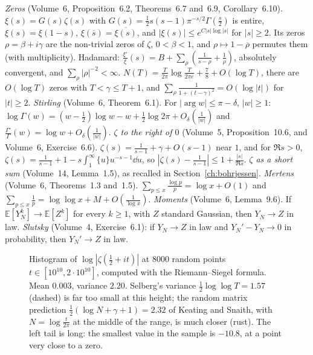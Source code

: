 \begin{reminder}
\emph{Zeros} (Volume~6, Proposition~6.2, Theorems~6.7 and~6.9, Corollary~6.10). $\xi(s)=G(s)\zeta(s)$ with $G(s)=\frac12s(s-1)\pi^{-s/2}\Gamma(\frac s2)$ is entire, $\xi(s)=\xi(1-s)$, $\xi(\overline s)=\overline{\xi(s)}$, and $|\xi(s)|\le e^{C|s|\log|s|}$ for $|s|\ge2$. Its zeros $\rho=\beta+i\gamma$ are the non-trivial zeros of $\zeta$, $0<\beta<1$, and $\rho\mapsto1-\overline\rho$ permutes them (with multiplicity). Hadamard: $\frac{\xi'}\xi(s)=B+\sum_\rho(\frac1{s-\rho}+\frac1\rho)$, absolutely convergent, and $\sum_\rho|\rho|^{-2}<\infty$. $N(T)=\frac T{2\pi}\log\frac T{2\pi e}+\frac78+O(\log T)$, there are $O(\log T)$ zeros with $T<\gamma\le T+1$, and $\sum_\rho\frac1{1+(t-\gamma)^2}=O(\log|t|)$ for $|t|\ge2$.
\emph{Stirling} (Volume~6, Theorem~6.1). For $|\arg w|\le\pi-\delta$, $|w|\ge1$: $\log\Gamma(w)=(w-\frac12)\log w-w+\frac12\log2\pi+O_\delta(\frac1{|w|})$ and $\frac{\Gamma'}\Gamma(w)=\log w+O_\delta(\frac1{|w|})$.
\emph{$\zeta$ to the right of $0$} (Volume~5, Proposition~10.6, and Volume~6, Exercise~6.6). $\zeta(s)=\frac1{s-1}+\gamma+O(s-1)$ near $1$, and for $\Re s>0$, $\zeta(s)=\frac1{s-1}+1-s\int_1^\infty\{u\}u^{-s-1}\dd u$, so $|\zeta(s)-\frac1{s-1}|\le1+\frac{|s|}{\Re s}$.
\emph{$\zeta$ as a short sum} (Volume~14, Lemma~1.5), as recalled in Section~\ref{ch:bohrjessen}.
\emph{Mertens} (Volume~6, Theorems~1.3 and~1.5). $\sum_{p\le x}\frac{\log p}p=\log x+O(1)$ and $\sum_{p\le x}\frac1p=\log\log x+M+O(\frac1{\log x})$.
\emph{Moments} (Volume~6, Lemma~9.6). If $\mathbb E[Y_N^k]\to\mathbb E[Z^k]$ for every $k\ge1$, with $Z$ standard Gaussian, then $Y_N\to Z$ in law. \emph{Slutsky} (Volume~4, Exercise~6.1): if $Y_N\to Z$ in law and $Y_N'-Y_N\to0$ in probability, then $Y_N'\to Z$ in law.
\end{reminder}

\begin{figure}[ht]
\centering{}
\caption{Histogram of $\log|\zeta(\frac12+it)|$ at $8000$ random points $t\in[10^{10},2\cdot10^{10}]$, computed with the Riemann--Siegel formula. Mean $0.003$, variance $2.20$. Selberg's variance $\frac12\log\log T=1.57$ (dashed) is far too small at this height; the random matrix prediction $\frac12(\log N+\gamma+1)=2.32$ of Keating and Snaith, with $N=\log\frac t{2\pi}$ at the middle of the range, is much closer (rust). The left tail is long: the smallest value in the sample is $-10.8$, at a point very close to a zero.}
\label{fig:selberghist}
\end{figure}


